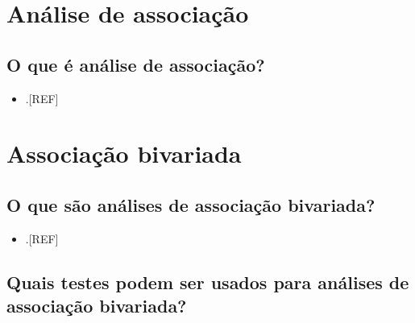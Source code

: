 \documentclass[
  a4paper,
]{book}
\providecommand{\tightlist}{%
  \setlength{\itemsep}{0pt}\setlength{\parskip}{0pt}}
\begin{document}
\hypertarget{analise-associacao}{%
\section{Análise de associação}\label{analise-associacao}}

\hypertarget{o-que-uxe9-anuxe1lise-de-associauxe7uxe3o}{%
\subsection{O que é análise de associação?}\label{o-que-uxe9-anuxe1lise-de-associauxe7uxe3o}}

\begin{itemize}
\tightlist
\item
  .{[}REF{]}
\end{itemize}

\hypertarget{bivariada}{%
\section{Associação bivariada}\label{bivariada}}

\hypertarget{o-que-suxe3o-anuxe1lises-de-associauxe7uxe3o-bivariada}{%
\subsection{O que são análises de associação bivariada?}\label{o-que-suxe3o-anuxe1lises-de-associauxe7uxe3o-bivariada}}

\begin{itemize}
\tightlist
\item
  .{[}REF{]}
\end{itemize}

\hypertarget{quais-testes-podem-ser-usados-para-anuxe1lises-de-associauxe7uxe3o-bivariada}{%
\subsection{Quais testes podem ser usados para análises de associação bivariada?}\label{quais-testes-podem-ser-usados-para-anuxe1lises-de-associauxe7uxe3o-bivariada}}
\end{document}
